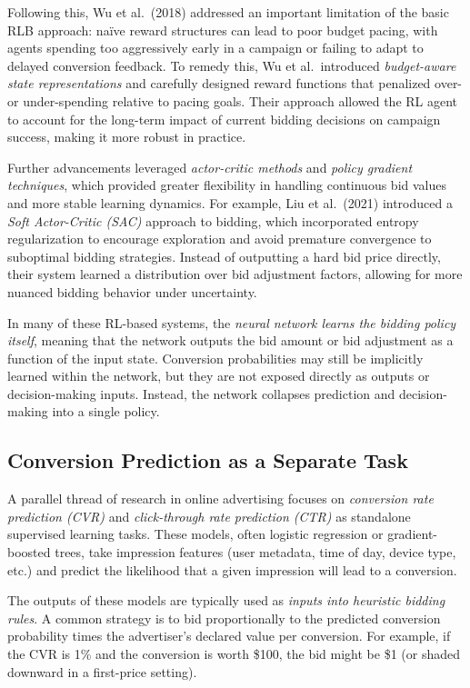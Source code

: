 \documentclass[11pt]{article}
\begin{document}
Following this, Wu et al.\ (2018) addressed an important limitation of the basic RLB approach: naïve reward structures can lead to poor budget pacing, with agents spending too aggressively early in a campaign or failing to adapt to delayed conversion feedback. To remedy this, Wu et al.\ introduced \emph{budget-aware state representations} and carefully designed reward functions that penalized over- or under-spending relative to pacing goals. Their approach allowed the RL agent to account for the long-term impact of current bidding decisions on campaign success, making it more robust in practice.

Further advancements leveraged \emph{actor-critic methods} and \emph{policy gradient techniques}, which provided greater flexibility in handling continuous bid values and more stable learning dynamics. For example, Liu et al.\ (2021) introduced a \emph{Soft Actor-Critic (SAC)} approach to bidding, which incorporated entropy regularization to encourage exploration and avoid premature convergence to suboptimal bidding strategies. Instead of outputting a hard bid price directly, their system learned a distribution over bid adjustment factors, allowing for more nuanced bidding behavior under uncertainty.

In many of these RL-based systems, the \emph{neural network learns the bidding policy itself}, meaning that the network outputs the bid amount or bid adjustment as a function of the input state. Conversion probabilities may still be implicitly learned within the network, but they are not exposed directly as outputs or decision-making inputs. Instead, the network collapses prediction and decision-making into a single policy.

\subsection{Conversion Prediction as a Separate Task}

A parallel thread of research in online advertising focuses on \emph{conversion rate prediction (CVR)} and \emph{click-through rate prediction (CTR)} as standalone supervised learning tasks. These models, often logistic regression or gradient-boosted trees, take impression features (user metadata, time of day, device type, etc.) and predict the likelihood that a given impression will lead to a conversion.

The outputs of these models are typically used as \emph{inputs into heuristic bidding rules}. A common strategy is to bid proportionally to the predicted conversion probability times the advertiser's declared value per conversion. For example, if the CVR is 1\% and the conversion is worth \$100, the bid might be \$1 (or shaded downward in a first-price setting).
\end{document}
